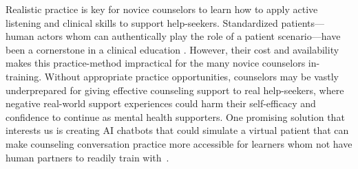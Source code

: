 Realistic practice is key for novice counselors to learn how to apply active listening and clinical skills to support help-seekers. 
Standardized patients---human actors whom can authentically play the role of a patient scenario---have been a cornerstone in a clinical education . However, their cost and availability  makes this practice-method impractical for the many novice counselors in-training. Without appropriate practice opportunities, counselors may be vastly underprepared for giving effective counseling support to real help-seekers, where negative real-world support experiences could harm their self-efficacy and confidence to continue as mental health supporters. One promising solution that interests us is creating AI chatbots that could simulate a virtual patient that can make counseling conversation practice more accessible for learners whom not have human partners to readily train with~\citep{othlinghaus2020seriousroleplaying, yang2024social}. 

